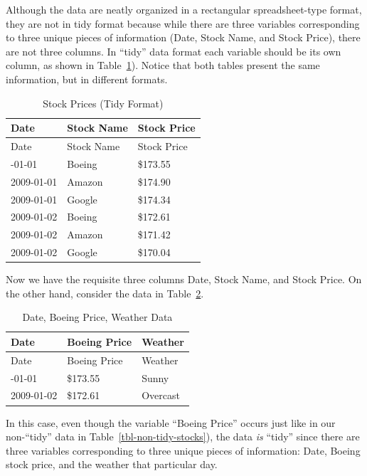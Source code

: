 \documentclass[
  letterpaper,
  DIV=11,
  numbers=noendperiod]{scrreprt}
\theoremstyle{definition}
\theoremstyle{remark}
\begin{document}
Although the data are neatly organized in a rectangular spreadsheet-type
format, they are not in tidy format because while there are three
variables corresponding to three unique pieces of information (Date,
Stock Name, and Stock Price), there are not three columns. In ``tidy''
data format each variable should be its own column, as shown in
Table~\ref{tbl-tidy-stocks}). Notice that both tables present the same
information, but in different formats.

\hypertarget{tbl-tidy-stocks}{}
\begin{longtable}[]{@{}lll@{}}
\caption{\label{tbl-tidy-stocks}Stock Prices (Tidy
Format)}\tabularnewline
\toprule\noalign{}
Date & Stock Name & Stock Price \\
\midrule\noalign{}
\endfirsthead
\toprule\noalign{}
Date & Stock Name & Stock Price \\
\midrule\noalign{}
\endhead
\bottomrule\noalign{}
\endlastfoot
2009-01-01 & Boeing & \$173.55 \\
2009-01-01 & Amazon & \$174.90 \\
2009-01-01 & Google & \$174.34 \\
2009-01-02 & Boeing & \$172.61 \\
2009-01-02 & Amazon & \$171.42 \\
2009-01-02 & Google & \$170.04 \\
\end{longtable}

Now we have the requisite three columns Date, Stock Name, and Stock
Price. On the other hand, consider the data in
Table~\ref{tbl-tidy-stocks-2}.

\hypertarget{tbl-tidy-stocks-2}{}
\begin{longtable}[]{@{}lll@{}}
\caption{\label{tbl-tidy-stocks-2}Date, Boeing Price, Weather
Data}\tabularnewline
\toprule\noalign{}
Date & Boeing Price & Weather \\
\midrule\noalign{}
\endfirsthead
\toprule\noalign{}
Date & Boeing Price & Weather \\
\midrule\noalign{}
\endhead
\bottomrule\noalign{}
\endlastfoot
2009-01-01 & \$173.55 & Sunny \\
2009-01-02 & \$172.61 & Overcast \\
\end{longtable}

In this case, even though the variable ``Boeing Price'' occurs just like
in our non-``tidy'' data in Table~\ref{tbl-non-tidy-stocks}), the data
\emph{is} ``tidy'' since there are three variables corresponding to
three unique pieces of information: Date, Boeing stock price, and the
weather that particular day.
\end{document}

